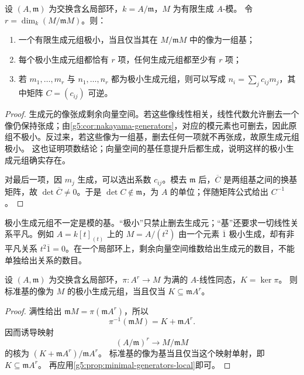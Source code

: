 \begin{proposition}\label{g5:prop:minimal-generators-local}
	设 \((A,\mathfrak m)\) 为交换含幺局部环，\(k=A/\mathfrak m\)，\(M\) 为有限生成 \(A\)-模。 令 \(r=\dim_k(M/\mathfrak mM)\)。则：
	\begin{enumerate}
		\item 一个有限生成元组极小，当且仅当其在 \(M/\mathfrak mM\) 中的像为一组基；
		\item 每个极小生成元组都恰有 \(r\) 项，任何生成元组都至少有 \(r\) 项；
		\item 若 \(m_1,\ldots,m_r\) 与 \(n_1,\ldots,n_r\) 都为极小生成元组，则可以写成
		\(n_i=\sum_j c_{ij}m_j\)，其中矩阵 \(C=(c_{ij})\) 可逆。
	\end{enumerate}
\end{proposition}
\begin{proof}
	生成元的像张成剩余向量空间。若这些像线性相关，线性代数允许删去一个像仍保持张成；由\cref{g5:cor:nakayama-generators}，对应的模元素也可删去，因此原组不极小。反过来，若这些像为一组基，删去任何一项就不再张成，故原生成元组极小。 这也证明项数结论；向量空间的基任意提升后都生成，说明这样的极小生成元组确实存在。

	对最后一项，因 \(m_j\) 生成，可以选出系数 \(c_{ij}\)。模去 \(\mathfrak m\) 后，\(\overline C\) 是两组基之间的换基矩阵，故 \(\det\overline C\ne0\)。于是 \(\det C\notin\mathfrak m\)，为 \(A\) 的单位；伴随矩阵公式给出 \(C^{-1}\)。
\end{proof}

极小生成元组不一定是模的基。“极小”只禁止删去生成元；“基”还要求一切线性关系平凡。例如 \(A=k[t]_{(t)}\) 上的 \(M=A/(t^2)\) 由一个元素 \(\overline1\) 极小生成，却有非平凡关系 \(t^2\overline1=0\)。在一个局部环上，剩余向量空间维数给出生成元的数目，不能单独给出关系的数目。

\begin{proposition}\label{g5:prop:minimal-presentation-local}
	设 \((A,\mathfrak m)\) 为交换含幺局部环，\(\pi:A^r\to M\) 为满的 \(A\)-线性同态，\(K=\ker\pi\)。 则标准基的像为 \(M\) 的极小生成元组，当且仅当 \(K\subseteq\mathfrak mA^r\)。
\end{proposition}
\begin{proof}
	满性给出 \(\mathfrak mM=\pi(\mathfrak mA^r)\)，所以
	\[
	\pi^{-1}(\mathfrak mM)=K+\mathfrak mA^r.
	\]
	因而诱导映射
	\[
	(A/\mathfrak m)^r\longrightarrow M/\mathfrak mM
	\]
	的核为 \((K+\mathfrak mA^r)/\mathfrak mA^r\)。 标准基的像为基当且仅当这个映射单射，即 \(K\subseteq\mathfrak mA^r\)。 再应用\cref{g5:prop:minimal-generators-local}即可。
\end{proof}


